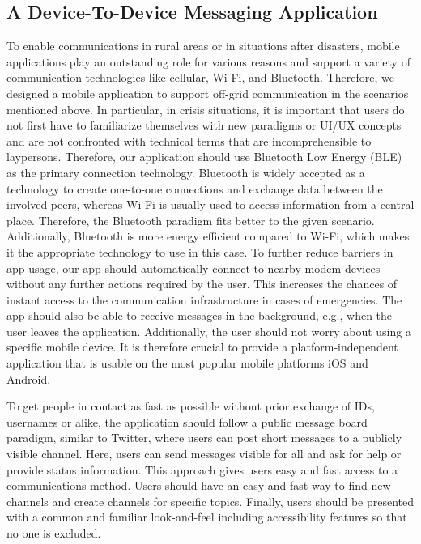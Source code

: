 \subsection{A Device-To-Device Messaging Application}
To enable communications in rural areas or in situations after disasters, mobile applications play an outstanding role for various reasons and support a variety of communication technologies like cellular, Wi-Fi, and Bluetooth.
Therefore, we designed a mobile application to support off-grid communication in the scenarios mentioned above.
In particular, in crisis situations, it is important that users do not first have to familiarize themselves with new paradigms or UI/UX concepts and are not confronted with technical terms that are incomprehensible to laypersons.
Therefore, our application should use Bluetooth Low Energy (BLE) as the primary connection technology.
Bluetooth is widely accepted as a technology to create one-to-one connections and exchange data between the involved peers, whereas Wi-Fi is usually used to access information from a central place.
Therefore, the Bluetooth paradigm fits better to the given scenario.
Additionally, Bluetooth is more energy efficient compared to Wi-Fi, which makes it the appropriate technology to use in this case.
To further reduce barriers in app usage, our app should automatically connect to nearby modem devices without any further actions required by the user.
This increases the chances of instant access to the communication infrastructure in cases of emergencies.
The app should also be able to receive messages in the background, e.g., when the user leaves the application.
Additionally, the user should not worry about using a specific mobile device.
It is therefore crucial to provide a platform-independent application that is usable on the most popular mobile platforms iOS and Android.

To get people in contact as fast as possible without prior exchange of IDs, usernames or alike, the application should follow a public message board paradigm, similar to Twitter, where users can post short messages to a publicly visible channel.
Here, users can send messages visible for all and ask for help or provide status information.
This approach gives users easy and fast access to a communications method.
Users should have an easy and fast way to find new channels and create channels for specific topics.
Finally, users should be presented with a common and familiar look-and-feel including accessibility features so that no one is excluded.

